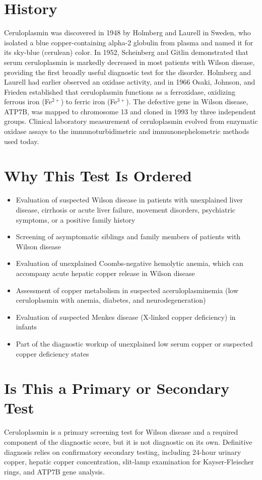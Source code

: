 \section*{History}
Ceruloplasmin was discovered in 1948 by Holmberg and Laurell in Sweden, who isolated a blue copper-containing alpha-2 globulin from plasma and named it for its sky-blue (cerulean) color. In 1952, Scheinberg and Gitlin demonstrated that serum ceruloplasmin is markedly decreased in most patients with Wilson disease, providing the first broadly useful diagnostic test for the disorder. Holmberg and Laurell had earlier observed an oxidase activity, and in 1966 Osaki, Johnson, and Frieden established that ceruloplasmin functions as a ferroxidase, oxidizing ferrous iron (Fe$^{2+}$) to ferric iron (Fe$^{3+}$). The defective gene in Wilson disease, ATP7B, was mapped to chromosome 13 and cloned in 1993 by three independent groups. Clinical laboratory measurement of ceruloplasmin evolved from enzymatic oxidase assays to the immunoturbidimetric and immunonephelometric methods used today.
\section*{Why This Test Is Ordered}
\begin{itemize}
  \item Evaluation of suspected Wilson disease in patients with unexplained liver disease, cirrhosis or acute liver failure, movement disorders, psychiatric symptoms, or a positive family history
  \item Screening of asymptomatic siblings and family members of patients with Wilson disease
  \item Evaluation of unexplained Coombs-negative hemolytic anemia, which can accompany acute hepatic copper release in Wilson disease
  \item Assessment of copper metabolism in suspected aceruloplasminemia (low ceruloplasmin with anemia, diabetes, and neurodegeneration)
  \item Evaluation of suspected Menkes disease (X-linked copper deficiency) in infants
  \item Part of the diagnostic workup of unexplained low serum copper or suspected copper deficiency states
\end{itemize}
\section*{Is This a Primary or Secondary Test}
Ceruloplasmin is a primary screening test for Wilson disease and a required component of the diagnostic score, but it is not diagnostic on its own. Definitive diagnosis relies on confirmatory secondary testing, including 24-hour urinary copper, hepatic copper concentration, slit-lamp examination for Kayser-Fleischer rings, and ATP7B gene analysis.
